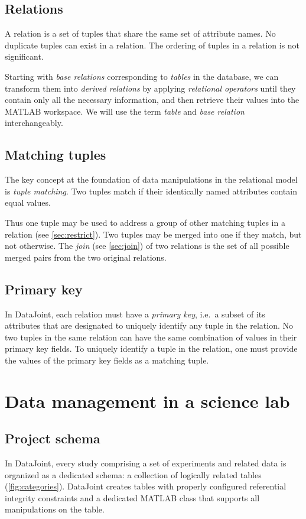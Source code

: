 \documentclass[10pt]{article}
\begin{document}
\subsection{Relations}
A relation is a set of tuples that share the same set of attribute names. No duplicate tuples can exist in a relation.  The ordering of tuples in a relation is not significant.  

Starting with {\em base relations} corresponding to {\em tables} in the database, we can transform them into {\em derived relations} by applying {\em relational operators} until they contain only all the necessary information, and then retrieve their values into the MATLAB workspace.  We will use the term {\em table} and {\em base relation} interchangeably. 

\subsection{Matching tuples}\label{sec:matching}
The key concept at the foundation of data manipulations in the relational model is {\em tuple matching}.  Two tuples match if their identically named attributes contain equal values.  

Thus one tuple may be used to address a group of  other matching tuples in a relation (see \autoref{sec:restrict}). Two tuples may be merged into one if they match, but not otherwise.    The {\em join} (see \autoref{sec:join}) of two relations is the set of all possible merged pairs from the two original relations.

\subsection{Primary key}
In DataJoint, each relation must have a {\em primary key}, i.e.~a subset of its attributes that are designated to uniquely identify any tuple in the relation. No two tuples in the same relation can have the same combination of values in their primary key fields.  To uniquely identify a tuple in the relation, one must provide the values of the primary key fields as a matching tuple. 

\newpage\section{Data management in a science lab}
\subsection{Project schema}
In DataJoint, every study comprising a set of experiments and related data is organized as a dedicated schema: a collection of logically related tables (\autoref{fig:categories}).  DataJoint creates tables with properly configured referential integrity constraints and a dedicated MATLAB class that supports all manipulations on the table.
\end{document}
